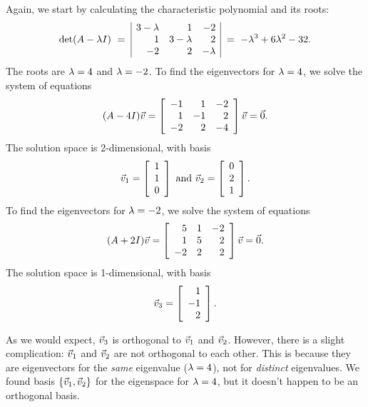 \documentclass{ximera}
\begin{document}
\begin{solution}
  Again, we start by calculating the characteristic polynomial and its roots:
  \begin{equation*}
    \det(A-\eigenvar I)
    ~=~ \begin{array}{|rrr|}
      3-\eigenvar  & 1 & -2 \\
      1  & 3-\eigenvar &  2 \\
      -2 & 2 &  -\eigenvar  \\
    \end{array}
    ~=~ - \eigenvar^3 + 6\eigenvar^2 -32.
  \end{equation*}
  The roots are $\eigenvar=4$ and $\eigenvar=-2$. To find the
  eigenvectors for $\eigenvar=4$, we solve the system of equations
  \begin{equation*}
    (A-4I)\vect{v}
    =
    \startmat{rrr}
      -1  & 1 & -2 \\
      1  & -1 &  2 \\
      -2 & 2 &  -4 \\
    \stopmat\vect{v}
    = \vect{0}.
  \end{equation*}
  The solution space is 2-dimensional, with basis
  \begin{equation*}
    \vect{v}_1 = \startmat{r} 1 \\ 1 \\ 0 \stopmat
    \quad\mbox{and}\quad
    \vect{v}_2 = \startmat{r} 0 \\ 2 \\ 1 \stopmat.
  \end{equation*}
  To find the eigenvectors for $\eigenvar=-2$, we solve the system of
  equations
  \begin{equation*}
    (A+2I)\vect{v}
    =
    \startmat{rrr}
      5  & 1 & -2 \\
      1  & 5 &  2 \\
      -2 & 2 &  2 \\
    \stopmat\vect{v}
    = \vect{0}.
  \end{equation*}
  The solution space is 1-dimensional, with basis
  \begin{equation*}
    \vect{v}_3 = \startmat{r} 1 \\ -1 \\ 2 \stopmat.
  \end{equation*}

  As we would expect,
  $\vect{v}_3$ is orthogonal to $\vect{v}_1$ and
  $\vect{v}_2$. However, there is a slight complication: $\vect{v}_1$
  and $\vect{v}_2$ are not orthogonal to each other. This is because
  they are eigenvectors for the {\em same} eigenvalue ($\eigenvar=4$),
  not for {\em distinct} eigenvalues. We found basis
  $\set{\vect{v}_1,\vect{v}_2}$ for the eigenspace for $\eigenvar=4$,
  but it doesn't happen to be an orthogonal basis. 
  

\end{solution}
\end{document}
